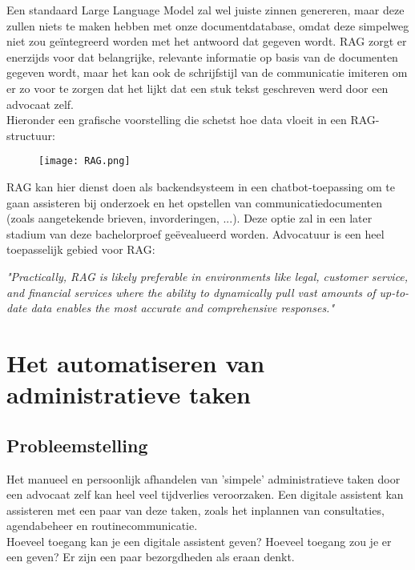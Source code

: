Een standaard Large Language Model zal wel juiste zinnen genereren, maar deze zullen niets te maken hebben met onze documentdatabase, omdat deze simpelweg niet zou geïntegreerd worden met het antwoord dat gegeven wordt.
RAG zorgt er enerzijds voor dat belangrijke, relevante informatie op basis van de documenten gegeven wordt, maar het kan ook de schrijfstijl van de communicatie imiteren om er zo voor te zorgen dat het lijkt dat een stuk tekst
geschreven werd door een advocaat zelf. \\

Hieronder een grafische voorstelling die schetst hoe data vloeit in een RAG-structuur:
\begin{figure}[h]
	\texttt{[image: RAG.png]}
	\centering
\end{figure}
\autocite{MediumRAG}

RAG kan hier dienst doen als backendsysteem in een chatbot-toepassing om te gaan assisteren bij onderzoek en het opstellen van communicatiedocumenten (zoals aangetekende brieven, invorderingen, ...). 
Deze optie zal in een later stadium van deze bachelorproef geëvealueerd worden. Advocatuur is een heel toepasselijk gebied voor RAG:

\begin{displayquote}
	\textit{"Practically, RAG is likely preferable in environments like
		legal, customer service, and financial services where the ability to
		dynamically pull vast amounts of up-to-date data enables the most accurate and comprehensive responses."} \autocite{MediumRAG}
\end{displayquote}

\newpage
\section{Het automatiseren van administratieve taken}
\subsection{Probleemstelling}
Het manueel en persoonlijk afhandelen van 'simpele' administratieve taken door een advocaat zelf kan heel veel tijdverlies veroorzaken.
Een digitale assistent kan assisteren met een paar van deze taken, zoals het inplannen van consultaties, agendabeheer en routinecommunicatie. \\
Hoeveel toegang kan je een digitale assistent geven? Hoeveel toegang zou je er een geven? Er zijn een paar bezorgdheden als eraan denkt. 

